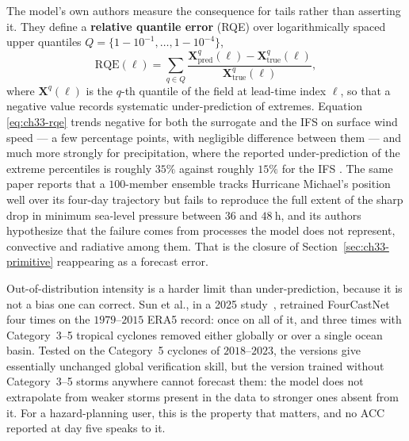 The model's own authors measure the consequence for tails rather than asserting it. They
define a \textbf{relative quantile error} (RQE) over logarithmically spaced upper quantiles
$Q = \{1-10^{-1}, \dots, 1-10^{-4}\}$,
\begin{equation}
  \label{eq:ch33-rqe}
  \mathrm{RQE}(\ell) = \sum_{q \in Q} \frac{\mathbf{X}^{q}_{\text{pred}}(\ell) - \mathbf{X}^{q}_{\text{true}}(\ell)}{\mathbf{X}^{q}_{\text{true}}(\ell)},
\end{equation}
where $\mathbf{X}^{q}(\ell)$ is the $q$-th quantile of the field at lead-time index $\ell$,
so that a negative value records systematic under-prediction of extremes. Equation
\eqref{eq:ch33-rqe} trends negative for both the surrogate and the IFS on surface wind
speed --- a few percentage points, with negligible difference between them --- and much
more strongly for precipitation, where the reported under-prediction of the extreme
percentiles is roughly $35\%$ against roughly $15\%$ for the IFS
\cite{pathak2022fourcastnet}. The same paper reports that a $100$-member ensemble tracks
Hurricane Michael's position well over its four-day trajectory but fails to reproduce the
full extent of the sharp drop in minimum sea-level pressure between $36$ and $48\ \mathrm{h}$,
and its authors hypothesize
that the failure comes from processes the model does not represent, convective and radiative
among them. That is the
closure of Section~\ref{sec:ch33-primitive} reappearing as a forecast error. 

Out-of-distribution intensity is a harder limit than under-prediction, because it is not a
bias one can correct. Sun et al., in a 2025 study~\cite{sun2025grayswan}, retrained FourCastNet four times
on the $1979$--$2015$ ERA5 record: once on all of it, and three times with Category~3--5
tropical cyclones removed either globally or over a single ocean basin. Tested on the
Category~5 cyclones of $2018$--$2023$, the versions give essentially unchanged global
verification skill, but the version trained without Category~3--5 storms anywhere cannot
forecast them: the model does not extrapolate from weaker storms present in the
data to stronger ones absent from it. For a hazard-planning user, this is the property that
matters, and no ACC reported at day five speaks to it. 

